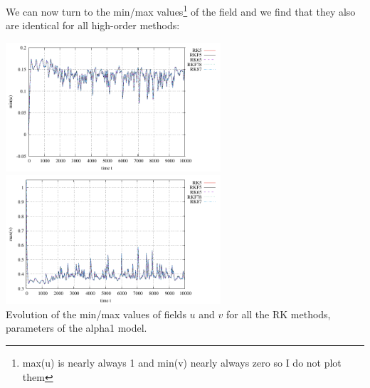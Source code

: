 We can now turn to the min/max values\footnote{max(u) is 
nearly always 1 and min(v) nearly always zero so I do not plot them} 
of the field and we find that 
they also are identical for all high-order methods:
\begin{center}
\includegraphics[width=8cm]{python_codes/fieldstone_171/RKtest2/stats_u.pdf}
\includegraphics[width=8cm]{python_codes/fieldstone_171/RKtest2/stats_v.pdf}\\
{\captionfont Evolution of the min/max values of fields $u$
and $v$ for all the RK methods, parameters of the alpha1 model.}
\end{center}

